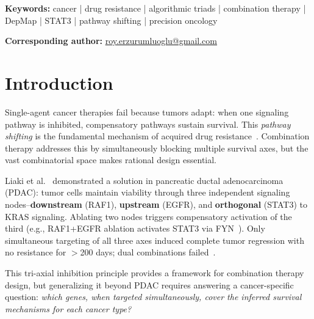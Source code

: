 \documentclass[times, twoside, watermark]{zHenriquesLab-StyleBioRxiv}
\newenvironment{keywords}{\noindent\textbf{Keywords:} }{\par}%
\begin{document}
\begin{keywords}
cancer | drug resistance | algorithmic triads | combination therapy | DepMap | STAT3 | pathway shifting | precision oncology
\end{keywords}

\noindent\textbf{Corresponding author:} \href{mailto:roy.erzurumluoglu@gmail.com}{roy.erzurumluoglu@gmail.com}

\newpage
\twocolumn
\raggedbottom
\sloppy

\renewcommand{\dbltopfraction}{0.9}      %
\renewcommand{\textfraction}{0.07}       %
\renewcommand{\dblfloatpagefraction}{0.7}%
\setcounter{dbltopnumber}{2}             %
\setcounter{topnumber}{3}
\setcounter{totalnumber}{5}


\section*{Introduction}

Single-agent cancer therapies fail because tumors adapt: when one signaling pathway is inhibited, compensatory pathways sustain survival. This \emph{pathway shifting} is the fundamental mechanism of acquired drug resistance~\cite{Bergholz2021,Xin2024}. Combination therapy addresses this by simultaneously blocking multiple survival axes, but the vast combinatorial space makes rational design essential.

Liaki et al.~\cite{Liaki2025} demonstrated a solution in pancreatic ductal adenocarcinoma (PDAC): tumor cells maintain viability through three independent signaling nodes--\textbf{downstream} (RAF1), \textbf{upstream} (EGFR), and \textbf{orthogonal} (STAT3) to KRAS signaling. Ablating two nodes triggers compensatory activation of the third (e.g., RAF1+EGFR ablation activates STAT3 via FYN~\cite{Chougule2016,Zhang2020FYN}). Only simultaneous targeting of all three axes induced complete tumor regression with no resistance for $>$200 days; dual combinations failed~\cite{Liaki2025}.

This tri-axial inhibition principle provides a framework for combination therapy design, but generalizing it beyond PDAC requires answering a cancer-specific question: \emph{which genes, when targeted simultaneously, cover the inferred survival mechanisms for each cancer type?}
\end{document}
